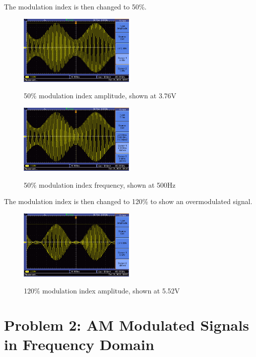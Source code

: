 The modulation index is then changed to 50\%.
\begin{figure}[H]
    \centering
    \includegraphics[width=0.5\textwidth]{images/execution_01_05_amp.png}
    \label{fig:execution_01_05_amplitude}
    \caption{50\% modulation index amplitude, shown at 3.76V}
\end{figure}
\begin{figure}[H]
    \centering
    \includegraphics[width=0.5\textwidth]{images/execution_01_05_freq.png}
    \label{fig:execution_01_05_frequency}
    \caption{50\% modulation index frequency, shown at 500Hz}
\end{figure}

The modulation index is then changed to 120\% to show an overmodulated signal.

\begin{figure}[H]
    \centering
    \includegraphics[width=0.5\textwidth]{images/execution_01_12_amp.png}
    \label{fig:execution_01_12_amplitude}
    \caption{120\% modulation index amplitude, shown at 5.52V}
\end{figure}

\section{Problem 2: AM Modulated Signals in Frequency Domain}

